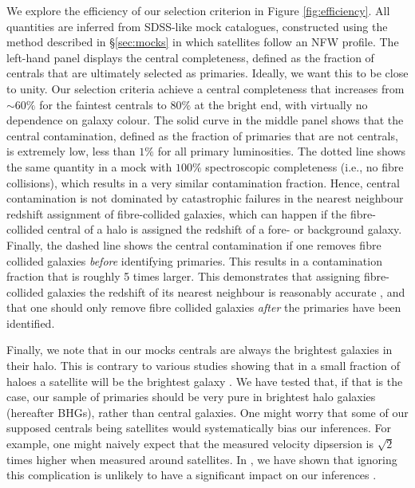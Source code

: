 \documentclass[fleqn,usenatbib,useAMS]{mnras}
\begin{document}
	We explore the efficiency of our selection criterion in Figure \ref{fig:efficiency}. All quantities are inferred from SDSS-like mock catalogues, constructed using the method described in \S\ref{sec:mocks} in which satellites follow an NFW profile. The left-hand panel displays the central completeness, defined as the fraction of centrals that are ultimately selected as primaries. Ideally, we want this to be close to unity. Our selection criteria achieve a central completeness that increases from $\sim 60\%$ for the faintest centrals to $80\%$ at the bright end, with virtually no dependence on galaxy colour. The solid curve in the middle panel shows that the central contamination, defined as the fraction of primaries that are not centrals, is extremely low, less than $1\%$ for all primary luminosities. The dotted line shows the same quantity in a mock with $100\%$ spectroscopic completeness (i.e., no fibre collisions), which results in a very similar contamination fraction. Hence, central contamination is not dominated by  catastrophic failures in the nearest neighbour redshift assignment of fibre-collided galaxies, which can happen if the fibre-collided central of a halo is assigned the redshift of a fore- or background galaxy.   Finally, the dashed line shows the central contamination if one removes fibre collided galaxies {\it before} identifying primaries. This results in a contamination fraction that is roughly 5 times larger. This demonstrates that assigning fibre-collided galaxies the redshift of its nearest neighbour is reasonably accurate \citep[see also][]{Zehavi+11}, and that one should only remove fibre collided galaxies {\it after} the primaries have been identified.
	
	Finally, we note that in our mocks centrals are always the brightest galaxies in their halo. This is contrary to various studies showing that in a small fraction of haloes a satellite will be the brightest galaxy \citep{Skibba+11, Hikage+13, Wang+14, Hoshino+15, Lange+18a}. We have tested that, if that is the case, our sample of primaries should be very pure in brightest halo galaxies (hereafter BHGs), rather than central galaxies. One might worry that some of our supposed centrals being satellites would systematically bias our inferences. For example, one might naively expect that the measured velocity dipsersion is $\sqrt{2}$ times higher when measured around satellites. In \cite{Lange+18a}, we have shown that ignoring this complication is unlikely to have a significant impact on our inferences \citep[see also][]{Skibba+11}.
	
\end{document}
